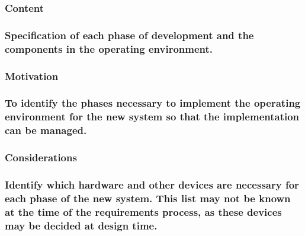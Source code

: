 \documentclass[
]{article}
\begin{document}
\hypertarget{content-70}{%
\subsubsection{Content}\label{content-70}}

\hypertarget{specification-of-each-phase-of-development-and-the-components-in-the-operating-environment.}{%
\subsubsection{\texorpdfstring{Specification of each phase of
development and the components in the operating environment.
}{Specification of each phase of development and the components in the operating environment. }}\label{specification-of-each-phase-of-development-and-the-components-in-the-operating-environment.}}

\hypertarget{motivation-69}{%
\subsubsection{Motivation}\label{motivation-69}}

\hypertarget{to-identify-the-phases-necessary-to-implement-the-operating-environment-for-the-new-system-so-that-the-implementation-can-be-managed.}{%
\subsubsection{To identify the phases necessary to implement the
operating environment for the new system so that the implementation can
be
managed.}\label{to-identify-the-phases-necessary-to-implement-the-operating-environment-for-the-new-system-so-that-the-implementation-can-be-managed.}}

\hypertarget{considerations-51}{%
\subsubsection{Considerations}\label{considerations-51}}

\hypertarget{identify-which-hardware-and-other-devices-are-necessary-for-each-phase-of-the-new-system.-this-list-may-not-be-known-at-the-time-of-the-requirements-process-as-these-devices-may-be-decided-at-design-time.}{%
\subsubsection{\texorpdfstring{Identify which hardware and other devices
are necessary for each phase of the new system. This list may not be
known at the time of the requirements process, as these devices may be
decided at design time.
}{Identify which hardware and other devices are necessary for each phase of the new system. This list may not be known at the time of the requirements process, as these devices may be decided at design time. }}\label{identify-which-hardware-and-other-devices-are-necessary-for-each-phase-of-the-new-system.-this-list-may-not-be-known-at-the-time-of-the-requirements-process-as-these-devices-may-be-decided-at-design-time.}}
\end{document}
